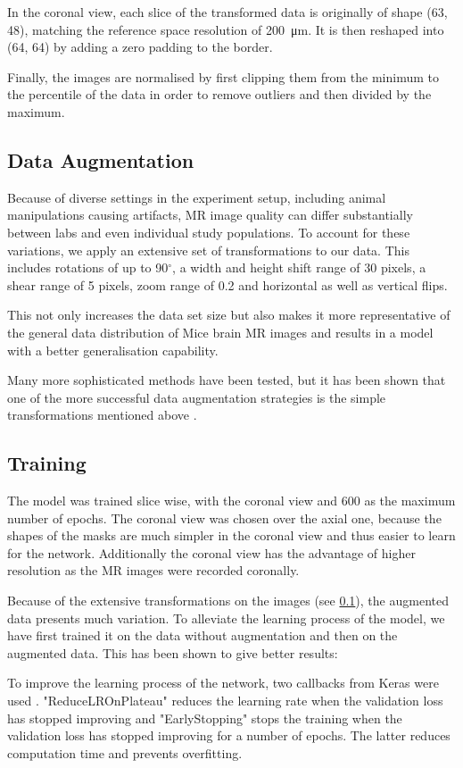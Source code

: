 In the coronal view, each slice of the transformed data is originally of shape (63, 48), matching the reference space resolution of \SI{200}{\micro\metre}.
It is then reshaped into (64, 64) by adding a zero padding to the border.

Finally, the images are normalised by first clipping them from the minimum to the  percentile of the data in order to remove outliers and then divided by the maximum.

\subsection{Data Augmentation} \label{Data Augmentation}

Because of diverse settings in the experiment setup, including animal manipulations causing artifacts, MR image quality can differ substantially between labs and even individual study populations.
To account for these variations, we apply an extensive set of transformations to our data.
This includes rotations of up to 90$^{\circ}$, a width and height shift range of 30 pixels, a shear range of 5 pixels, zoom range of 0.2 and horizontal as well as vertical flips.

This not only increases the data set size but also makes it more representative of the general data distribution of Mice brain MR images and results in a model with a better generalisation capability.

Many more sophisticated methods have been tested, but it has been shown that one of the more successful data augmentation strategies is the simple transformations mentioned above \cite{perez_effectiveness_2017}.


\subsection{Training}
The model was trained slice wise, with the coronal view and 600 as the maximum number of epochs.
The coronal view was chosen over the axial one, because the shapes of the masks are much simpler in the coronal view and thus easier to learn for the network.
Additionally the coronal view has the advantage of higher resolution as the MR images were recorded coronally.

Because of the extensive transformations on the images (see \cref{Data Augmentation}), the augmented data presents much variation.
To alleviate the learning process of the model, we have first trained it on the data without augmentation and then on the augmented data.
This has been shown to give better results: 

To improve the learning process of the network, two callbacks from Keras were used \cite{noauthor_callbacks_nodate}. "ReduceLROnPlateau" reduces the learning rate when the validation loss has stopped improving and "EarlyStopping" stops the training when the validation loss has stopped improving for a number of epochs.
The latter reduces computation time and prevents overfitting.